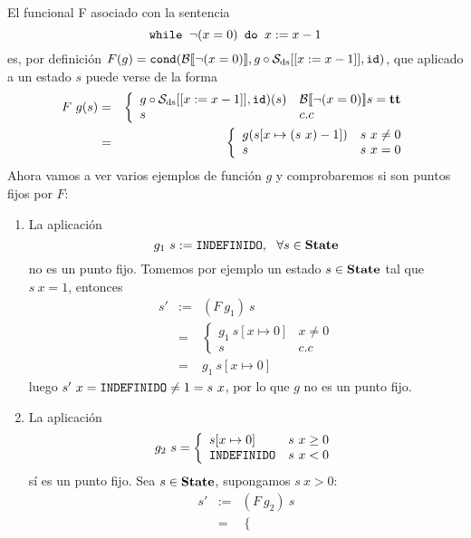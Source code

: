 \begin{example}[Ejercicio 5.2] El funcional F asociado con la sentencia
\[
    \texttt{while } \neg(x=0) \texttt{ do } x:= x-1
\]
es, por definición $F(g) = \texttt{cond}(\mathcal{B}[\![\neg(x=0)]\!], g\circ\mathcal{S}_{\mathrm{ds}}[[x:= x-1]], \texttt{id})$, que aplicado a un estado $s$ puede verse de la forma
\begin{eqnarray*}
    F\ g (s) &=& \left\{\begin{array}{ll}
          g\circ\mathcal{S}_{\mathrm{ds}}[[x:= x-1]], \texttt{id}) (s) & \mathcal{B}[\![\neg(x=0)]\!]s = \textbf{tt} \\
          s &  c.c
    \end{array}\right. \\
    &=& \left\{\begin{array}{ll}
          g(s[x \mapsto (s\ x) - 1]) & s\ x\neq 0 \\
          s &  s\ x = 0
    \end{array}\right.
\end{eqnarray*}
Ahora vamos a ver varios ejemplos de función $g$ y comprobaremos si son puntos fijos por $F$:
\begin{enumerate}
    \item La aplicación
    \[
        g_1\ s := \texttt{INDEFINIDO},\ \ \forall s\in\textbf{State}
    \]
    no es un punto fijo. Tomemos por ejemplo un estado $s\in\textbf{State}$ tal que $s\ x = 1$, entonces
    \begin{eqnarray*}
        s' &:=& (F\ g_1)\  s \\
        &=& \left\{\begin{array}{ll}
        g_1\ s[x \mapsto 0] & x\neq 0 \\
          s &  c.c\end{array}\right. \\
        &=& g_1\ s[x \mapsto 0]
    \end{eqnarray*}
    luego $s'\ x = \texttt{INDEFINIDO} \neq 1 = s\ x$, por lo que $g$ no es un punto fijo.
    \item La aplicación
    \[
         g_2\ s = \left\{\begin{array}{ll}
          s[x\mapsto 0] & s\ x \geq 0 \\
          \texttt{INDEFINIDO} &  s\ x < 0
    \end{array}\right.
    \]
    sí es un punto fijo. Sea $s\in\textbf{State}$, supongamos $s\ x > 0$:
    \begin{eqnarray*}
        s' &:=& (F\ g_2)\  s \\
        &=& \left\{\begin{array}{ll}

\end{array}
\end{eqnarray*}
\end{enumerate}
\end{example}
